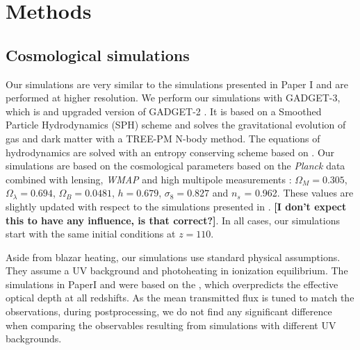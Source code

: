 \documentclass[numberedappendix]{emulateapj}
\newcommand\ALc[1]{{\color{red} \bf #1}} %
\begin{document}




\section{Methods}\label{sec:sims}

\subsection{Cosmological simulations}
Our simulations are very similar to the simulations presented in Paper I and are performed at higher resolution. We perform our simulations with \textsc{GADGET-3}, which is and upgraded version of \textsc{GADGET-2} \citep{2005MNRAS.364.1105S}.  It is based on a Smoothed Particle Hydrodynamics (SPH) scheme and solves the gravitational evolution of gas and dark matter with a TREE-PM N-body method.  The equations of hydrodynamics are solved with an entropy conserving scheme based on \citep{2002MNRAS.333..649S}.   Our simulations are based on the cosmological parameters based on  the \textit{Planck} data combined with lensing, \textit{WMAP} and high multipole measurements \citep{2014A&A...571A..16P}: $\Omega_M = 0.305$, $\Omega_{\lambda} = 0.694$, $\Omega_B = 0.0481$, $h = 0.679$, $\sigma_8 = 0.827$ and $n_s$ = 0.962.  These values are slightly updated with respect to the simulations presented in \citep{2012MNRAS.423..149P,2015ApJ...811...19L}. \ALc{[I don't expect this to have any influence, is that correct?]}. In all cases, our simulations start with the same initial conditions at $z=110$. 



Aside from blazar heating, our simulations use standard physical assumptions. They  assume a \citet{2012ApJ...746..125H} UV background and photoheating in ionization equilibrium. The simulations in  PaperI and \citet{2012MNRAS.423..149P} were based on the \citet{2009ApJ...703.1416F}, which overpredicts the effective optical depth at all redshifts. As the mean transmitted flux is tuned to match the observations, during postprocessing, we do not find any significant difference when comparing the observables resulting from simulations with different UV backgrounds.
\end{document}
